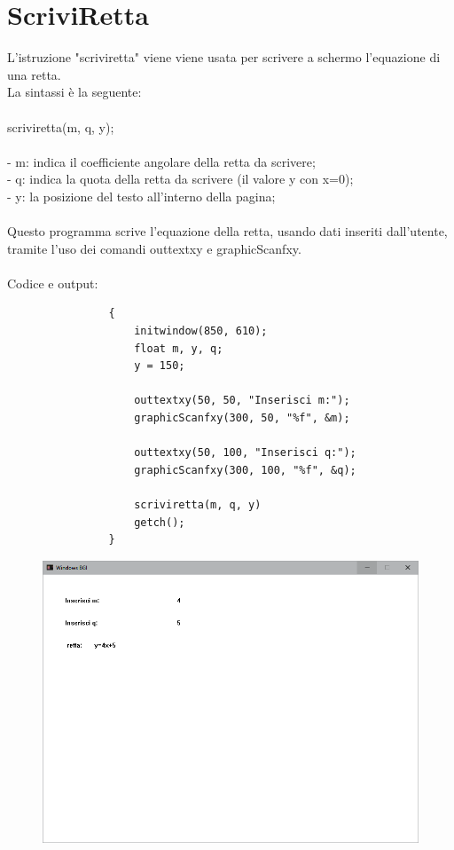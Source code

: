 \documentclass[12pt]{book}
\begin{document}
		\section{ScriviRetta}
			L'istruzione "scriviretta" viene viene usata per scrivere a schermo l'equazione di una retta.
			\\La sintassi è la seguente:
			\\
			\\
			\Large scriviretta(m, q, y);
			\normalsize
			\\
			\\- m: indica il coefficiente angolare della retta da scrivere;
			\\- q: indica la quota della retta da scrivere (il valore y con x=0);
			\\- y: la posizione del testo all'interno della pagina;
			\\
			\\Questo programma scrive l'equazione della retta, usando dati inseriti dall'utente, tramite l'uso dei comandi outtextxy e graphicScanfxy.
			\\
			\\Codice e output:
			\begin{lstlisting}
				{
					initwindow(850, 610);
					float m, y, q;
					y = 150;

					outtextxy(50, 50, "Inserisci m:");
					graphicScanfxy(300, 50, "%f", &m);

					outtextxy(50, 100, "Inserisci q:");
					graphicScanfxy(300, 100, "%f", &q);

					scriviretta(m, q, y)
					getch();
				}
			\end{lstlisting}
			\begin{figure}[h]
				\includegraphics[scale=0.5]{scrivirettaterminale1}
			\end{figure}
		\clearpage
\end{document}
